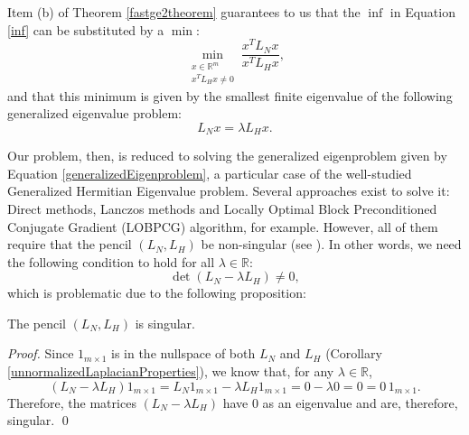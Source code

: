 Item (b) of Theorem \vref{fastge2theorem} guarantees to us that the $\inf$ in Equation \vref{inf} can be substituted by a $\min$:
\begin{equation}\label{min}
   \min_{\substack{x \in \mathbb R^m \\ x^T L_H x \ne 0}} \frac{x^T L_N x}{x^T L_H x},
\end{equation}
and that this minimum is given by the smallest finite eigenvalue of the following generalized eigenvalue problem:
\begin{equation}\label{generalizedEigenproblem}
   L_N x = \lambda L_H x.
\end{equation}

Our problem, then, is reduced to solving the generalized eigenproblem given by Equation \vref{generalizedEigenproblem}, a particular case of the well-studied Generalized Hermitian Eigenvalue problem.
Several approaches exist to solve it: Direct methods, Lanczos methods and Locally Optimal Block Preconditioned Conjugate Gradient (LOBPCG) algorithm, for example. 
However, all of them require that the pencil $(L_N, L_H)$ be non-singular (see \cite{templates}).
In other words, we need the following condition to hold for all $\lambda \in \mathbb R$:
\begin{equation}
   \det (L_N - \lambda L_H) \ne 0,
\end{equation}
which is problematic due to the following proposition:
\begin{proposition}
   The pencil $(L_N, L_H)$ is singular.
\end{proposition}
\begin{proof}
   Since $1_{m \times 1}$ is in the nullspace of both $L_N$ and $L_H$ (Corollary \vref{unnormalizedLaplacianProperties}), we know that, for any $\lambda \in \mathbb R$,
   \begin{equation*}
      (L_N - \lambda L_H) 1_{m \times 1} = L_N 1_{m \times 1} - \lambda L_H 1_{m \times 1} = 0 - \lambda 0 = 0 = 0 \, 1_{m \times 1}.
   \end{equation*}
   Therefore, the matrices $(L_N - \lambda L_H)$ have $0$ as an eigenvalue and are, therefore, singular. \qed
\end{proof}

